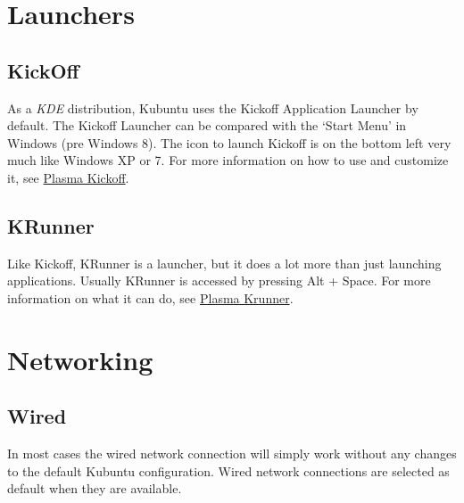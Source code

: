 \documentclass[letterpaper,10pt,english]{sphinxmanual}
\begin{document}
\section{Launchers}
\label{docs/basic:launchers}

\subsection{KickOff}
\label{docs/basic:kickoff}
\noindent{}

As a \emph{KDE} distribution, Kubuntu uses the Kickoff Application Launcher by default. The Kickoff Launcher can be compared with the `Start Menu' in Windows (pre Windows 8). The icon to launch Kickoff is on the bottom left very much like Windows XP or 7. For more information on how to use and customize it, see \href{https://userbase.kde.org/Special:MyLanguage/Plasma/Kickoff}{Plasma Kickoff}.


\subsection{KRunner}
\label{docs/basic:krunner}

Like Kickoff, KRunner is a launcher, but it does a lot more than just launching applications. Usually KRunner is accessed by pressing Alt + Space. For more information on what it can do, see \href{https://userbase.kde.org/Special:MyLanguage/Plasma/Krunner}{Plasma Krunner}.


\section{Networking}
\label{docs/basic:networking}
\noindent{}


\subsection{Wired}
\label{docs/basic:wired}
In most cases the wired network connection will simply work without any changes to the default Kubuntu configuration. Wired network connections are selected as default when they are available.
\end{document}
